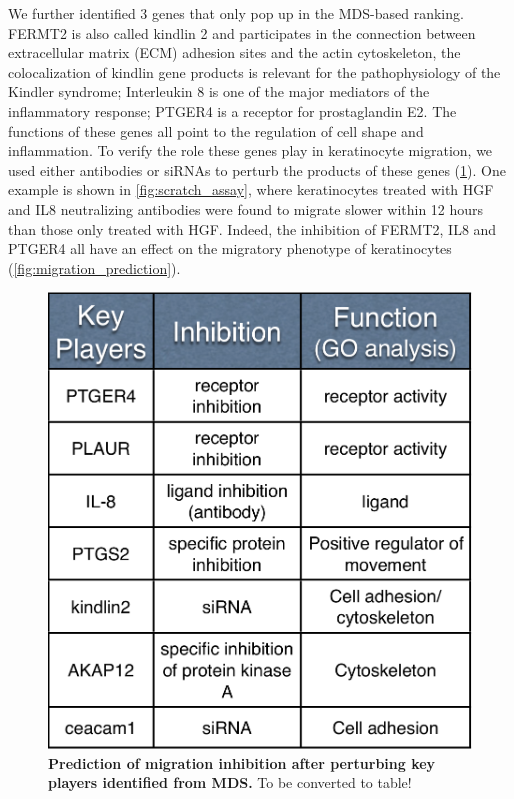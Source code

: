 We further identified 3 genes that only pop up in the MDS-based ranking.
FERMT2 is also called kindlin 2 and participates in the connection between 
extracellular matrix (ECM) adhesion sites and the actin cytoskeleton, the
colocalization of kindlin gene products is relevant for the pathophysiology
of the Kindler syndrome; Interleukin 8 is one of the major mediators
of the inflammatory response; PTGER4 is a receptor for prostaglandin E2.
The functions of these genes all point to the regulation of cell shape and
inflammation. 
To verify the role these genes play in keratinocyte migration,
we used either antibodies or siRNAs to perturb the products of these genes
(\ref{fig:inhibition_method}). One example is shown in 
\ref{fig:scratch_assay}, where keratinocytes treated with HGF and IL8 
neutralizing antibodies were found to migrate slower within 12 hours 
than those only treated with HGF.
Indeed, the inhibition of FERMT2, IL8 and PTGER4 all have an effect on the 
migratory phenotype of keratinocytes (\ref{fig:migration_prediction}).

\begin{figure}[!ht]
\begin{center}
\includegraphics[width=\textwidth]{inhibition_method.pdf}
\end{center}
\caption[Prediction of migration inhibition after perturbing key players]{
{\bf Prediction of migration inhibition after perturbing key players identified
from MDS.} To be converted to table!
}
\label{fig:inhibition_method}
\end{figure}

